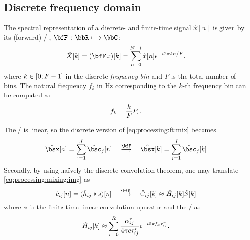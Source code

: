 \subsection{Discrete frequency domain}
The spectral representation of a discrete- and finite-time signal $\hat{x}[n]$ is given by its (forward) \DFTdef/
,
$\discreteFT{}:\bbR\kmapsto\bbC$:
\begin{equation}\label{eq:processing:dft}
    \hat{X}[ k] = (\discreteFT{x})[k] =
    \sum_{n = 0}^{N - 1}
    \hat{x}[ n]
    \cste^{-\csti2\pi k n / F}.
\end{equation}
where $k \in \kintervcc{0}{F - 1}$ in the discrete \textit{frequency bin} and $F$ is the total number of bins.
The natural frequency $f_k$ in $\si{\Hz}$ corresponding to the $k$-th frequency bin can be computed as
\begin{equation}\label{eq:processing:fk}
    f_k = \frac{k}{F}F_s
    .
\end{equation}

\mynewline
The \DFT/ is linear, so the discrete version of \cref{eq:processing:ft:mix} becomes
\begin{equation}\label{eq:processing:dft:mix}
    \hat{\mics}[ n] = \sum_{\idxSrc=1}^{\numSrcs} \hat{\imgs}_\idxSrc[ n]
    \mathspace\overset{\discreteFT}{\kto}\mathspace
    \hat{\mics}[ k] = \sum_{\idxSrc=1}^{\numSrcs} \hat{\imgs}_\idxSrc[ k]
\end{equation}
Secondly, by using na\"ively the discrete convolution theorem, one may translate \cref{eq:processing:mixing:img} as
\begin{equation}\label{eq:processing:discreteModel}
    \hat{\img}_{ij}[n] = (\hat{\rir}_{ij} \convDis \hat{\src})[n]
    \mathspace\overset{\discreteFT{}}{\kto}\mathspace
    \hat{C}_{ij}[k] \approx \hat{H}_{ij}[k] \hat{S}[k]
\end{equation}
where $\ast$ is the finite-time linear convolution operator and the \RIR/ as
\begin{equation}\label{eq:processing:discreteModel:rir}
    \hat{H}_{ij}[ k] \approx \sum_{r=0}^{R}
                \frac{\alpha_{ij}^r}{4 \pi c \tau_{ij}^r}
                {e}^{- {i} 2 \pi f_k \tau_{ij}^r}
    .
\end{equation}

